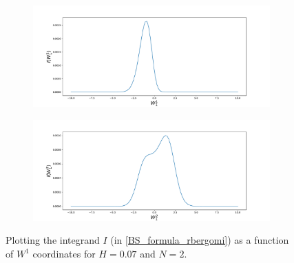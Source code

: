 \documentclass[11pt]{article}
\begin{document}
\begin{figure}[h!]
	\centering
	\begin{subfigure}{.4\textwidth}
		\centering
		\includegraphics[width=1\linewidth]{./figures/integrand_plotting_rBergomi/1D_plots/N_2/H_007/Bergomi_integrand_K_1_H_007_W11_N_2}
		\caption{}
		\label{fig:sub3}
	\end{subfigure}%
	\begin{subfigure}{.4\textwidth}
		\centering
		\includegraphics[width=1\linewidth]{./figures/integrand_plotting_rBergomi/1D_plots/N_2/H_007/Bergomi_integrand_K_1_H_007_W12_N_2}
		\caption{}
		\label{fig:sub4}
	\end{subfigure}
	\caption{Plotting the integrand $I$ (in \eqref{BS_formula_rbergomi}) as a function of $W^1$ coordinates for $H=0.07$ and $N=2$.}
	\label{fig:Integrand_H_007_N_2_W_1}
\end{figure}
\end{document}
